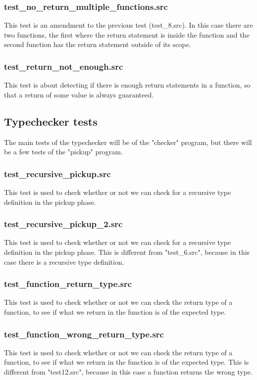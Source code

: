 \documentclass[a4paper,10pt,titlepage]{report}
\begin{document}
\subsubsection{test\_no\_return\_multiple\_functions.src}
This test is an amendment to the previous test (test\_8.src). In this case there are two functions, the first where the return statement is inside the function and the second function has the return statement outside of its scope.

\subsubsection{test\_return\_not\_enough.src}
This test is about detecting if there is enough return statements in a function, so that a return of some value is always guaranteed. 

\subsection{Typechecker tests}
The main tests of the typechecker will be of the "checker" program, but there will be a few tests of the "pickup" program.
\subsubsection{test\_recursive\_pickup.src}
This test is used to check whether or not we can check for a recursive type definition in the pickup phase.
\subsubsection{test\_recursive\_pickup\_2.src}
This test is used to check whether or not we can check for a recursive type definition in the pickup phase. This is different from "test\_6.src", because in this case there is a recursive type definition.
\subsubsection{test\_function\_return\_type.src}
This test is used to check whether or not we can check the return type of a function, to see if what we return in the function is of the expected type.
\subsubsection{test\_function\_wrong\_return\_type.src}
This test is used to check whether or not we can check the return type of a function, to see if what we return in the function is of the expected type. This is different from "test12.src", because in this case a function returns the wrong type.
\end{document}
